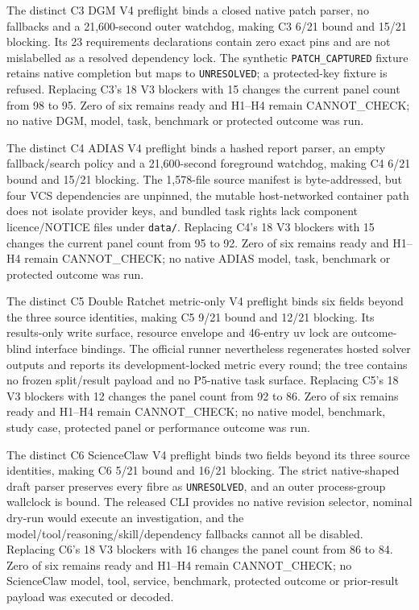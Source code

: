 The distinct C3 DGM V4 preflight binds a closed native patch parser, no
fallbacks and a 21,600-second outer watchdog, making C3 6/21 bound and 15/21
blocking. Its 23 requirements declarations contain zero exact pins and are not
mislabelled as a resolved dependency lock. The synthetic
\texttt{PATCH\_CAPTURED} fixture retains native completion but maps to
\texttt{UNRESOLVED}; a protected-key fixture is refused. Replacing C3's 18 V3
blockers with 15 changes the current panel count from 98 to 95. Zero of six
remains ready and H1--H4 remain \textsf{CANNOT\_CHECK}; no native DGM, model,
task, benchmark or protected outcome was run.

The distinct C4 ADIAS V4 preflight binds a hashed report parser, an empty
fallback/search policy and a 21,600-second foreground watchdog, making C4 6/21
bound and 15/21 blocking. The 1,578-file source manifest is byte-addressed, but
four VCS dependencies are unpinned, the mutable host-networked container path
does not isolate provider keys, and bundled task rights lack component
licence/NOTICE files under \texttt{data/}. Replacing C4's 18 V3 blockers with
15 changes the current panel count from 95 to 92. Zero of six remains ready and
H1--H4 remain \textsf{CANNOT\_CHECK}; no native ADIAS model, task, benchmark or
protected outcome was run.

The distinct C5 Double Ratchet metric-only V4 preflight binds six fields beyond
the three source identities, making C5 9/21 bound and 12/21 blocking. Its
results-only write surface, resource envelope and 46-entry uv lock are
outcome-blind interface bindings. The official runner nevertheless regenerates
hosted solver outputs and reports its development-locked metric every round;
the tree contains no frozen split/result payload and no P5-native task surface.
Replacing C5's 18 V3 blockers with 12 changes the panel count from 92 to 86.
Zero of six remains ready and H1--H4 remain \textsf{CANNOT\_CHECK}; no native
model, benchmark, study case, protected panel or performance outcome was run.

The distinct C6 ScienceClaw V4 preflight binds two fields beyond its three
source identities, making C6 5/21 bound and 16/21 blocking. The strict
native-shaped draft parser preserves every fibre as \texttt{UNRESOLVED}, and
an outer process-group wallclock is bound. The released CLI provides no native
revision selector, nominal dry-run would execute an investigation, and the
model/tool/reasoning/skill/dependency fallbacks cannot all be disabled.
Replacing C6's 18 V3 blockers with 16 changes the panel count from 86 to 84.
Zero of six remains ready and H1--H4 remain \textsf{CANNOT\_CHECK}; no
ScienceClaw model, tool, service, benchmark, protected outcome or prior-result
payload was executed or decoded.

